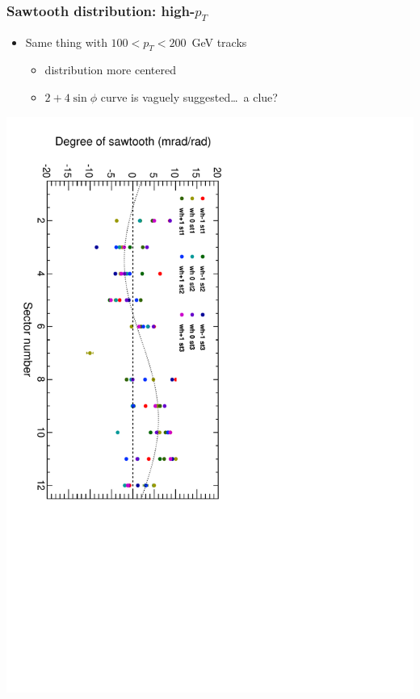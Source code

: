 \documentclass[compress]{beamer}
\begin{document}
\begin{frame}
\frametitle{Sawtooth distribution: high-$p_T$}

\begin{itemize}
\item Same thing with $100 < p_T < 200$~GeV tracks
\begin{itemize}\setlength{\itemsep}{0.1 cm}
\item distribution more centered
\item $2 + 4\sin\phi$ curve is vaguely suggested\ldots\ a clue?
\end{itemize}
\end{itemize}

\includegraphics[height=\linewidth, angle=90]{sawtooth_bysector_highp.pdf}
\end{frame}
\end{document}
